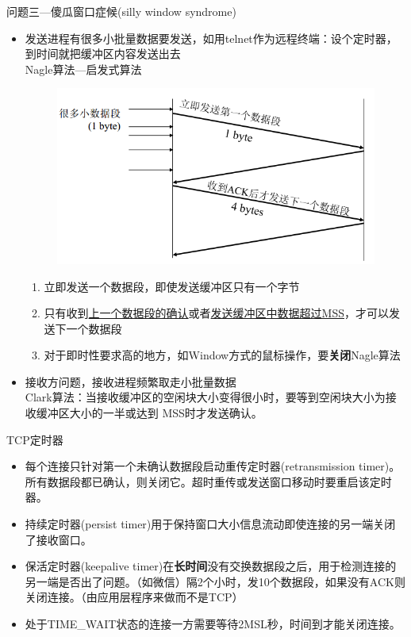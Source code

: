 问题三---傻瓜窗口症候(silly window syndrome)
\begin{itemize}
    \item 发送进程有很多小批量数据要发送，如用telnet作为远程终端：设个定时器，到时间就把缓冲区内容发送出去\\
    Nagle算法---启发式算法
    \begin{figure}[H]
        \centering
        \includegraphics[width=0.6\linewidth]{fig/nagle.PNG}
    \end{figure}
    \begin{enumerate}
        \item 立即发送一个数据段，即使发送缓冲区只有一个字节
        \item 只有收到\underline{上一个数据段的确认}或者\underline{发送缓冲区中数据超过MSS}，才可以发送下一个数据段
        \item 对于即时性要求高的地方，如Window方式的鼠标操作，要\textbf{关闭}Nagle算法
    \end{enumerate}
    \item 接收方问题，接收进程频繁取走小批量数据\\
    Clark算法：当接收缓冲区的空闲块大小变得很小时，要等到空闲块大小为接收缓冲区大小的一半或达到 MSS时才发送确认。
\end{itemize}

TCP定时器
\begin{itemize}
\item 每个连接只针对第一个未确认数据段启动重传定时器(retransmission timer)。所有数据段都已确认，则关闭它。超时重传或发送窗口移动时要重启该定时器。
\item 持续定时器(persist timer)用于保持窗口大小信息流动即使连接的另一端关闭了接收窗口。
\item 保活定时器(keepalive timer)在\textbf{长时间}没有交换数据段之后，用于检测连接的另一端是否出了问题。（如微信）隔2个小时，发10个数据段，如果没有ACK则关闭连接。（由应用层程序来做而不是TCP）
\item 处于TIME\_WAIT状态的连接一方需要等待2MSL秒，时间到才能关闭连接。
\end{itemize}